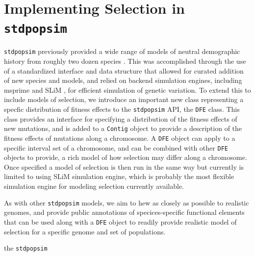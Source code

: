 \documentclass[hidelinks]{article}
\newcommand{\stdpopsim}{\texttt{stdpopsim}\xspace}
\begin{document}
\section*{Implementing Selection in \stdpopsim}
    \label{selection}

    \stdpopsim previously provided a wide range of models of neutral
    demographic history from roughly two dozen species \citep{lauterbur2023expanding}.
    This was accomplished through the use of a standardized interface
    and data structure that allowed for curated addition of new
    species and models, and relied on backend simulation engines,
    including msprime \citep{Baumdicker2022} and SLiM \citep{haller2019slim},
    for efficient simulation of genetic variation.
    To extend this to include models of selection, 
    we introduce an important new class representing a specfic distribution of fitness effects
    to the \stdpopsim API, the \texttt{DFE} class. 
    This class provides an interface for specifying
    a distribution of the fitness effects of new mutations, and
    is added to a \texttt{Contig} object to provide a description
    of the fitness effects of mutations along a chromosome.
    A \texttt{DFE} object can apply to a specific interval set of a chromosome,
    and can be combined with other \texttt{DFE} objects to provide, 
    a rich model of how selection may differ along a chromosome. 
    Once specified a model of selection is then run in the same way
    but currently is limited to using SLiM simulation engine, which
    is probably the most flexible simulation engine for modeling selection currently available.


    As with other \stdpopsim models, we aim to hew as closely as possible
    to realistic genomes, and provide public annotations of specices-specific functional
    elements that can be used along with a \texttt{DFE} object to
    readily provide realistic model of selection for a specific genome and set of
    populations. 

    the \stdpopsim 
\end{document}
